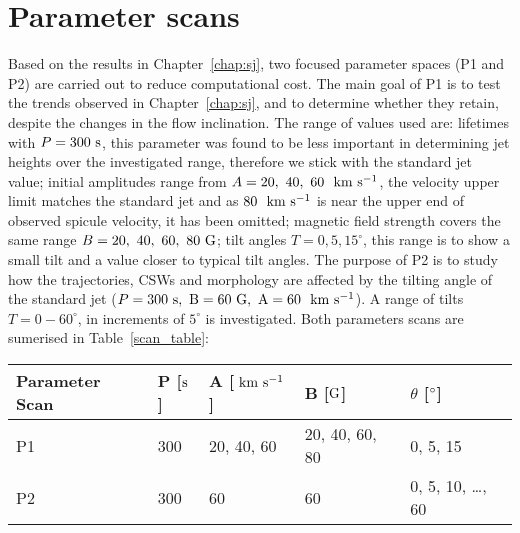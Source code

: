 \section{Parameter scans}
\label{sec:pscansII}
Based on the results in Chapter~\ref{chap:sj}, two focused parameter spaces (P1 and P2) are carried out to reduce computational cost. The main goal of P1 is to test the trends observed in Chapter~\ref{chap:sj}, and to determine whether they retain, despite the changes in the flow inclination. The range of values used are: lifetimes with $P=300~\rm{s}$, this parameter was found to be less important in determining jet heights over the investigated range, therefore we stick with the standard jet value; initial amplitudes range from $A=20,~40,~60~~\rm{km ~s^{-1}}$, the velocity upper limit matches the standard jet and as $80~~\rm{km ~s^{-1}}$ is near the upper end of observed spicule velocity, it has been omitted; magnetic field strength covers the same range $B=20,~40,~60,~80~\rm{G}$; tilt angles $T=0,5,15^{\circ}$, this range is to show a small tilt and a value closer to typical tilt angles. The purpose of P2 is to study how the trajectories, CSWs and morphology are affected by the tilting angle of the standard jet ($P=300~\rm{s}, ~B=60~\rm{G}, ~A=60~~\rm{km ~s^{-1}}$). A range of tilts $T=0-60^{\circ}$, in increments of $5^{\circ}$ is investigated. Both parameters scans are sumerised in Table~\ref{scan_table}:
\begin{table*}[]
\centering
\caption{Two sets (P1 \& P2) of parameter magnitudes, including driver lifetimes ($P$), velocity amplitude ($A$), magnetic field strength ($B$) and corresponding inclination angles for simulated jet structure.}
\begin{tabular}{l|l|l|l|l}
\hline
Parameter Scan & P [$\rm{s}$] & A [$~\rm{km ~s^{-1}}$] & B [$\rm{G}$]      & $\theta$ [$^{\circ}$]                                 \\ \hline
P1             & 300       & 20, 40, 60     & 20, 40, 60, 80 & 0, 5, 15                                         \\
P2             & 300       & 60             & 60             & 0, 5, 10, \dots, 60
\\ \hline
\end{tabular}
\label{scan_table}
\end{table*}
